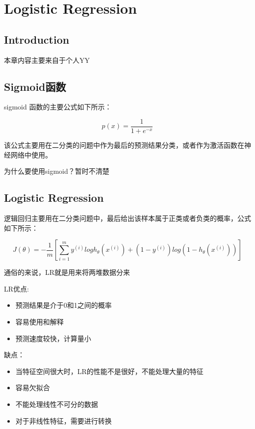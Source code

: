 \chapter{Logistic Regression}

\section*{Introduction}
	本章内容主要来自于个人YY

\section{Sigmoid函数}
	\boldmath  %
	sigmoid 函数的主要公式如下所示：
	
	\begin{equation}
		p(x) = \frac{1}{1+e^{-x}}
	\end{equation}		
	
	该公式主要用在二分类的问题中作为最后的预测结果分类，或者作为激活函数在神经网络中使用。
	
	为什么要使用sigmoid？暂时不清楚
	

\section{Logistic Regression}
	\boldmath  %
	逻辑回归主要用在二分类问题中，最后给出该样本属于正类或者负类的概率，公式如下所示：
	
	\begin{equation}
		J(\theta) = - \frac{1}{m} \left[ \sum_{i=1}^{m} y^{(i)} log h_\theta(x^{(i)})+ (1-y^{(i)})log(1-h_\theta(x^{(i)})) \right]	
	
	\end{equation}
	
	通俗的来说，LR就是用来将两堆数据分来
	
	LR优点:
	
	\begin{itemize}
		\item 预测结果是介于0和1之间的概率
		\item 容易使用和解释
		\item 预测速度较快，计算量小
	\end{itemize}
	
	缺点：
	\begin{itemize}
		\item 当特征空间很大时，LR的性能不是很好，不能处理大量的特征
		\item 容易欠拟合
		\item 不能处理线性不可分的数据
		\item 对于非线性特征，需要进行转换
	\end{itemize}










